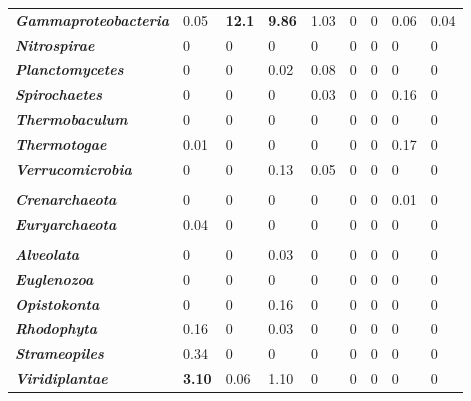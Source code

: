 \begin{table}
\begin{tabularx}{\textwidth}{p{3.5cm}XXXXXXXX}
\textbf{\emph{Gammaproteobacteria}} & 0.05 & \textbf{12.1} & \textbf{9.86} & 1.03 & 0 & 0 & 0.06 & 0.04 \\
\textbf{\emph{Nitrospirae}} & 0 & 0 & 0 & 0 & 0 & 0 & 0 & 0 \\
\textbf{\emph{Planctomycetes}} & 0 & 0 & 0.02 & 0.08 & 0 & 0 & 0 & 0 \\
\textbf{\emph{Spirochaetes}} & 0 & 0 & 0 & 0.03 & 0 & 0 & 0.16 & 0 \\
\textbf{\emph{Thermobaculum}} & 0 & 0 & 0 & 0  & 0  & 0  & 0 & 0 \\
\textbf{\emph{Thermotogae}} & 0.01 & 0 & 0 & 0 & 0 & 0 & 0.17 & 0 \\
\textbf{\emph{Verrucomicrobia}} & 0 & 0 & 0.13 & 0.05 & 0 & 0 & 0 & 0 \\
 &  &  &  &  &  &  &  &  \\
\textbf{\emph{Crenarchaeota}} & 0 & 0 & 0 & 0 & 0 & 0 & 0.01 & 0 \\
\textbf{\emph{Euryarchaeota}} & 0.04 & 0 & 0 & 0 & 0 & 0 & 0 & 0 \\
 &  &  &  &  &  &  &  &  \\
\textbf{\emph{Alveolata}} & 0 & 0 & 0.03 & 0 & 0 & 0 & 0 & 0 \\
\textbf{\emph{Euglenozoa}} & 0 & 0 & 0 & 0 & 0 & 0 & 0 & 0 \\
\textbf{\emph{Opistokonta}} & 0 & 0 & 0.16 & 0 & 0 & 0 & 0 & 0 \\
\textbf{\emph{Rhodophyta}} & 0.16 & 0 & 0.03 & 0 & 0 & 0 & 0 & 0 \\
\textbf{\emph{Strameopiles}} & 0.34 & 0 & 0 & 0 & 0 & 0 & 0 & 0 \\
\textbf{\emph{Viridiplantae}} & \textbf{3.10} & 0.06 & 1.10 & 0 & 0 & 0 & 0 & 0 \\
\bottomrule
\end{tabularx}
\end{table}

